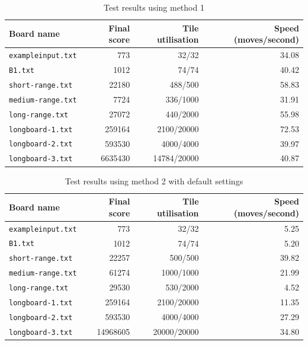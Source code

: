 \documentclass[a4paper, 11pt, titlepage]{report}
\begin{document}
\begin{table}[H]
  \centering
  \caption{Test results using method 1}
    \begin{tabular}{lrrr}
    \hline
    Board name & Final score & Tile utilisation & Speed (moves/second) \\
    \hline
    \texttt{exampleinput.txt} & 773   & 32/32 & 34.08 \\
    \texttt{B1.txt} & 1012  & 74/74 & 40.42 \\
    \texttt{short-range.txt} & 22180 & 488/500 & 58.83 \\
    \texttt{medium-range.txt} & 7724  & 336/1000 & 31.91 \\
    \texttt{long-range.txt} & 27072 & 440/2000 & 55.98 \\
    \texttt{longboard-1.txt} & 259164 & 2100/20000 & 72.53 \\
    \texttt{longboard-2.txt} & 593530 & 4000/4000 & 39.97 \\
    \texttt{longboard-3.txt} & 6635430 & 14784/20000 & 40.87 \\
    \hline
    \end{tabular}%
  \label{tab:results-method1}%
\end{table}%

\begin{table}[H]
  \centering
  \caption{Test results using method 2 with default settings}
    \begin{tabular}{lrrr}
    \hline
    Board name & Final score & Tile utilisation & Speed (moves/second) \\
    \hline
    \texttt{exampleinput.txt} & 773   & 32/32 & 5.25 \\
    \texttt{B1.txt} & 1012  & 74/74 & 5.20 \\
    \texttt{short-range.txt} & 22257 & 500/500 & 39.82 \\
    \texttt{medium-range.txt} & 61274 & 1000/1000 & 21.99 \\
    \texttt{long-range.txt} & 29530 & 530/2000 & 4.52 \\
    \texttt{longboard-1.txt} & 259164 & 2100/20000 & 11.35 \\
    \texttt{longboard-2.txt} & 593530 & 4000/4000 & 27.29 \\
    \texttt{longboard-3.txt} & 14968605 & 20000/20000 & 34.80 \\
    \hline
    \end{tabular}%
  \label{tab:results-method2-default}%
\end{table}%
\end{document}
